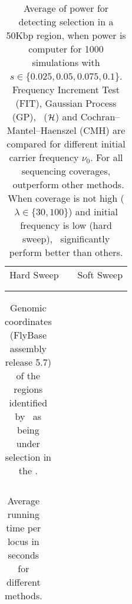 \begin{table}[h]
	\centering
	\begin{tabular}{ccc}
		Hard Sweep & &Soft Sweep\\ \\  
		
		&&
	\end{tabular}
        \caption{Average of power for detecting selection in a 50Kbp region, 
        when power is computer for 1000 simulations with 
        $s\in\{0.025,0.05,0.075,0.1\}$. Frequency Increment 
        Test (FIT), Gaussian Process (GP), \comale\ (${\cal H}$) and 
        Cochran–Mantel–Haenszel (CMH) are compared for different initial 
        carrier frequency $\nu_0$. For all sequencing coverages, \comale\ 
        outperform other methods. When coverage is not high 
        ($\lambda\in\{30,100\}$) and initial frequency is low (hard sweep), 
        \comale\ significantly perform better than others.}
\label{tab:power}
\end{table}


\begin{table}[h]
	\centering
	\begin{tabular}{c}
		
	\end{tabular}
	\caption{Genomic coordinates (FlyBase assembly release 5.7) of the regions 
		identified by \comale\ as being under selection in the 
		\datadm.}\label{tab:intervals}
\end{table}

\begin{table}[h]
	\centering
	\begin{tabular}{c}
		
	\end{tabular}
	\caption{Average running time per locus in seconds for different 
	methods.}\label{tab:times}
\end{table}